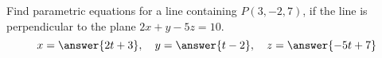 \documentclass{ximera}
\author{Anna Davis}
\begin{document}
\begin{exercise}
Find parametric equations for a line containing $P(3, -2, 7)$, if the line is perpendicular to the plane $2x+y-5z=10$.
$$x=\answer{2t+3},\quad y=\answer{t-2},\quad z=\answer{-5t+7}$$
 
\end{exercise}
\end{document}
